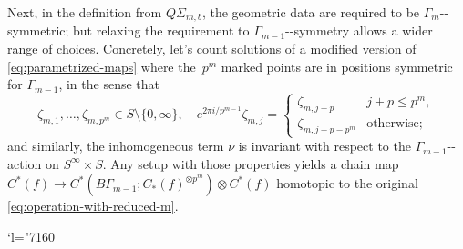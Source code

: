\documentclass[10pt,a4paper]{amsart}
\providecommand{\nobreakdash}{\nobreak\hbox{-}}
\newcommand{\Changel}{\mathcode`l="7160}
\theoremstyle{plain}
\theoremstyle{definition}
\begin{document}
Next, in the definition from $Q\Sigma_{m,b}$, the geometric data are required to be $\Gamma_m$\nobreakdash-symmetric; but relaxing the requirement to $\Gamma_{m-1}$\nobreakdash-symmetry allows a wider range of choices. Concretely, let's count solutions of a modified version of \eqref{eq:parametrized-maps} where the~$p^m$ marked points are in positions symmetric for $\Gamma_{m-1}$, in the sense that
\begin{equation}\label{eq:zeta-symmetry}
\zeta_{m,1},\dots,\zeta_{m,p^m} \in S \setminus \{0,\infty\}, \quad e^{2\pi i/p^{m-1}}\zeta_{m,j} = \begin{cases} \zeta_{m,j+p} & j+p \leq p^m, \\ \zeta_{m,j+p-p^m} & \text{otherwise;} \end{cases}
\end{equation}
and similarly, the inhomogeneous term $\nu$ is invariant with respect to the $\Gamma_{m-1}$\nobreakdash-action on $S^\infty \times S$. Any setup with those properties yields a chain map $C^*(f) \to C^*(B\Gamma_{m-1};C_*(f)^{\otimes p^m}) \otimes C^*(f)$ homotopic to the original \eqref{eq:operation-with-reduced-m}.

\Changel
\end{document}
